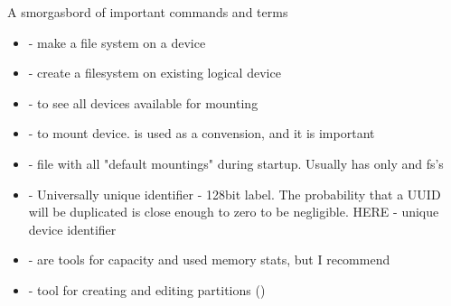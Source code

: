 \documentclass[usenames,dvipsnames,10pt,aspectratio=169]{beamer}
\begin{document}

\begin{frame}{A smorgasbord of important commands and terms}
    \begin{itemize}
        \item {} - make a file system on a device
        \item {} - create a filesystem on existing logical device
        \item {} - to see all devices available for mounting 
        \item {} - to mount device. is used as a convension, and it is important
        \item {}- file with all "default mountings" during startup. Usually has only \ex{/} and  fs's
        \item {} - Universally unique identifier - 128bit label. The probability that a UUID will be duplicated is close enough to zero to be negligible. HERE - unique device identifier
        \item {} - are tools for capacity and used memory stats, but I recommend 
        \item {} - tool for creating and editing partitions ()
    \end{itemize}
\end{frame}
\end{document}
